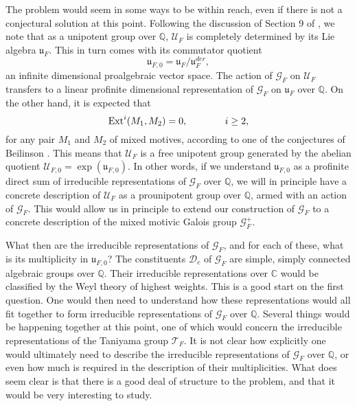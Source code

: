 \documentclass[preprint,12pt, leqno]{elsarticle}
\newcommand{\UGal}{\mathcal{G}_F}
\newcommand{\mQ}{\mathbb{Q}}
\newcommand{\mC}{\mathbb{C}}
\newcommand{\cD}{\mathcal{D}}
\newcommand{\cT}{\mathcal{T}}
\newcommand{\cU}{\mathcal{U}}
\newcommand{\fu}{\mathfrak{u}}
\newcommand{\SP}{\mkern70mu }
\numberwithin{equation}{section}
\theoremstyle{named}
\begin{document}
The problem would seem in some ways to be within reach, even if there is not a conjectural solution at this point. Following the discussion of Section 9 of \cite{N2}, we note that as a unipotent group over $\mQ$, $\cU_F$ is completely determined by its Lie algebra  $\fu_F$. This in turn comes with its commutator quotient
\begin{equation*}
    \mathfrak{u}_{F, 0} = \mathfrak{u}_F/\mathfrak{u}_F^{der},
\end{equation*}
an infinite dimensional proalgebraic vector space. The action of $\mathcal{G}_F$ on $\cU_F$ transfers to a linear profinite dimensional representation of $\mathcal{G}_F$ on $\mathfrak{u}_F$ over $\mathbb{Q}$. On the other hand, it is expected that
\begin{equation}\label{eq: 6.1}
    \mbox{Ext}^i(M_1, M_2) = 0, \SP i\ge 2,
\end{equation}
for any pair $M_1$ and $M_2$ of mixed motives, according to one of the conjectures of Beilinson \cite[p.12]{N}. This means that $\mathcal{U}_F$ is a free unipotent group generated by the abelian quotient $\mathcal{U}_{F, 0} = \exp(\mathfrak{u}_{F, 0})$. In other words, if we understand $\mathfrak{u}_{F, 0}$ as a profinite direct sum of irreducible representations of $\mathcal{G}_F$ over $\mathbb{Q}$, we will in principle have a concrete description of $\mathcal{U}_{F}$ as a prounipotent group over $\mathbb{Q}$, armed with an action of $\mathcal{G}_F$. This would allow us in principle to extend our construction of $\mathcal{G}_F$ to a concrete description of the mixed motivic Galois group $\mathcal{G}^+_F$.

What then are the irreducible representations of $\UGal$, and for each of these, what is its multiplicity in $\fu_{F, 0}$? The constituents $\cD_c$ of $\UGal$ are simple, simply connected algebraic groups over $\mQ$. Their irreducible representations over $\mC$ would be classified by the Weyl theory of highest weights. This is a good start on the first question. One would then need to understand how these representations would all fit together to form irreducible representations of $\UGal$ over $\mQ$. Several things would be happening together at this point, one of which would concern the irreducible representations of the Taniyama group $\cT_F$. It is not clear how explicitly one would ultimately need to describe the irreducible representations of $\UGal$ over $\mQ$, or even how much is required in the description of their multiplicities. What does seem clear is that there is a good deal of structure to the problem, and that it would be very interesting to study.
\end{document}
